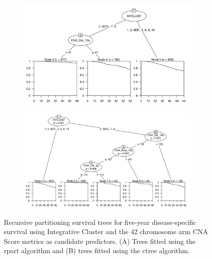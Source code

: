 \begin{figure}[!h]
\centering

\vspace{0.5cm}

\begin{subfigure}{\textwidth}
\subcaption{}
\includegraphics[width=1\textwidth]{../figures/Chapter_3/PA_PartyKit_Survival_Score_FiveYearDSS_INTCLUST.png}
\end{subfigure}

\vspace{2cm}

\begin{subfigure}{\textwidth}
\subcaption{}
\includegraphics[width=1\textwidth]{../figures/Chapter_3/PA_Ctree_Survival_Score_FiveYearDSS_INTCLUST.png}
\end{subfigure}

\vspace{0.5cm}

\caption[Recursive partitioning survival trees for five-year disease-specific survival using Integrative Cluster and the 42 chromosome arm CNA Score metrics as candidate predictors.]{Recursive partitioning survival trees for five-year disease-specific survival using Integrative Cluster and the 42 chromosome arm CNA Score metrics as candidate predictors. (A) Trees fitted using the rpart algorithm and (B) trees fitted using the ctree algorithm.}
\label{fig:INTCLUST_PA_CNA_Score_FiveYearDSS}
\end{figure}


